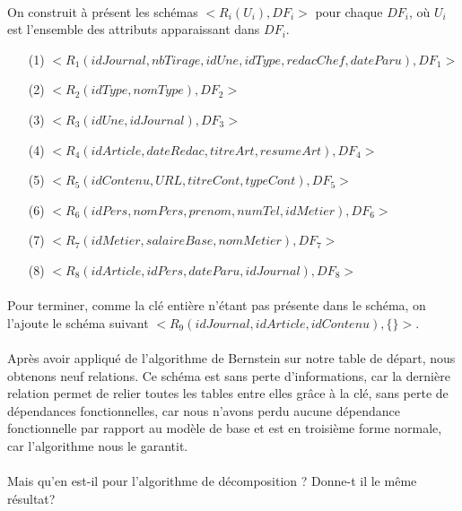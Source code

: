 \paragraph{}{
    On construit à présent les schémas $<R_{i}(U_{i}), DF_{i}>$ pour chaque $DF_{i}$, où $U_{i}$ est l'ensemble des attributs apparaissant dans $DF_{i}$.
}
\begin{enumerate}
    \item[(1)] $<R_{1}(idJournal, nbTirage, idUne, idType, redacChef, dateParu), DF_{1}>$
    \item[(2)] $<R_{2}(idType, nomType),DF_{2}>$
    \item[(3)] $<R_{3}(idUne, idJournal),DF_{3}>$
    \item[(4)] $<R_{4}(idArticle, dateRedac, titreArt, resumeArt),DF_{4}>$
    \item[(5)] $<R_{5}(idContenu, URL, titreCont, typeCont),DF_{5}>$
    \item[(6)] $<R_{6}(idPers, nomPers, prenom, numTel, idMetier),DF_{6}>$
    \item[(7)] $<R_{7}(idMetier, salaireBase, nomMetier),DF_{7}>$
    \item[(8)] $<R_{8}(idArticle, idPers, dateParu, idJournal),DF_{8}>$
\end{enumerate}

\paragraph{}{
    Pour terminer, comme la clé entière n'étant pas présente dans le schéma, on l'ajoute le schéma suivant $<R_{9}(idJournal, idArticle, idContenu), \{\}>$.
}

\paragraph{}{
    Après avoir appliqué de l'algorithme de Bernstein sur notre table de départ, nous obtenons neuf relations. Ce schéma est sans perte d'informations, car la dernière relation permet de relier toutes les tables entre elles grâce à la clé, sans perte de dépendances fonctionnelles, car nous n'avons perdu aucune dépendance fonctionnelle par rapport au modèle de base et est en troisième forme normale, car l'algorithme nous le garantit.
}

\paragraph{}{
    Mais qu'en est-il pour l'algorithme de décomposition ? Donne-t il le même résultat?
}

